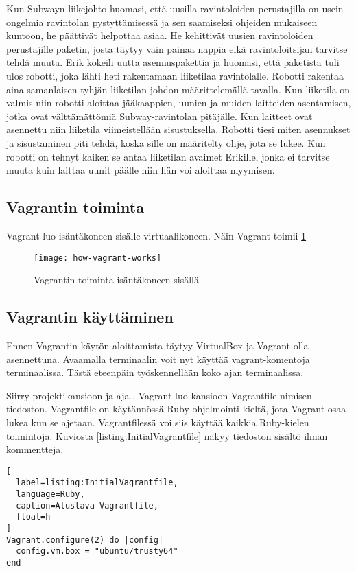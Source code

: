 Kun Subwayn liikejohto huomasi, että uusilla ravintoloiden perustajilla on usein ongelmia ravintolan pystyttämisessä ja sen saamiseksi ohjeiden mukaiseen kuntoon,  he päättivät helpottaa asiaa. He kehittivät uusien ravintoloiden perustajille paketin, josta täytyy vain painaa nappia eikä ravintoloitsijan tarvitse tehdä muuta. Erik kokeili uutta asennuspakettia ja huomasi, että paketista tuli ulos robotti, joka lähti heti rakentamaan liiketilaa ravintolalle. Robotti rakentaa aina samanlaisen tyhjän liiketilan johdon määrittelemällä tavalla. Kun liiketila on valmis niin robotti aloittaa jääkaappien, uunien ja muiden laitteiden asentamisen, jotka ovat välttämättömiä Subway-ravintolan pitäjälle. Kun laitteet ovat asennettu niin liiketila viimeistellään sisustuksella. Robotti tiesi miten asennukset ja sisustaminen piti tehdä, koska sille on määritelty ohje, jota se lukee. Kun robotti on tehnyt kaiken se antaa liiketilan avaimet Erikille, jonka ei tarvitse muuta kuin laittaa uunit päälle niin hän voi aloittaa myymisen.

\subsection{Vagrantin toiminta}
Vagrant luo isäntäkoneen sisälle virtuaalikoneen. 
Näin Vagrant toimii \ref{fig:how-vagrant-works}

\begin{figure}[h]
  \texttt{[image: how-vagrant-works]}
  \caption{Vagrantin toiminta isäntäkoneen sisällä}
  \label{fig:how-vagrant-works}
\end{figure}

\subsection{Vagrantin käyttäminen}
Ennen Vagrantin käytön aloittamista täytyy VirtualBox ja Vagrant olla asennettuna. Avaamalla terminaalin voit nyt käyttää vagrant-komentoja terminaalissa. Tästä eteenpäin työskennellään koko ajan terminaalissa.

Siirry projektikansioon ja aja . Vagrant luo kansioon Vagrantfile-nimisen tiedoston. Vagrantfile on käytännössä Ruby-ohjelmointi kieltä, jota Vagrant osaa lukea kun se ajetaan. Vagrantfilessä voi siis käyttää kaikkia Ruby-kielen toimintoja. Kuviosta \ref{listing:InitialVagrantfile} näkyy tiedoston sisältö ilman kommentteja.

\begin{lstlisting}[
  label=listing:InitialVagrantfile,
  language=Ruby,
  caption=Alustava Vagrantfile,
  float=h
]
Vagrant.configure(2) do |config|
  config.vm.box = "ubuntu/trusty64"
end
\end{lstlisting}

